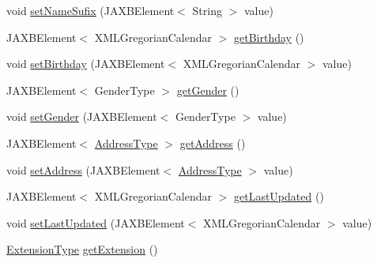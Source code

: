 \begin{DoxyCompactItemize}
\item 
void \hyperlink{classcom_1_1telefonica_1_1schemas_1_1unica_1_1rest_1_1directory_1_1v1_1_1UserPersonalInfoType_aadaae721fb2eded2ad7f74576fbb7bae}{setNameSufix} (JAXBElement$<$ String $>$ value)
\item 
JAXBElement$<$ XMLGregorianCalendar $>$ \hyperlink{classcom_1_1telefonica_1_1schemas_1_1unica_1_1rest_1_1directory_1_1v1_1_1UserPersonalInfoType_aa62b05ffbca263a1dc4df0349d376439}{getBirthday} ()
\item 
void \hyperlink{classcom_1_1telefonica_1_1schemas_1_1unica_1_1rest_1_1directory_1_1v1_1_1UserPersonalInfoType_abf1d21d341abdea4120e1a43ac30cc26}{setBirthday} (JAXBElement$<$ XMLGregorianCalendar $>$ value)
\item 
JAXBElement$<$ GenderType $>$ \hyperlink{classcom_1_1telefonica_1_1schemas_1_1unica_1_1rest_1_1directory_1_1v1_1_1UserPersonalInfoType_aad0acda007c02061e785817a5d967c41}{getGender} ()
\item 
void \hyperlink{classcom_1_1telefonica_1_1schemas_1_1unica_1_1rest_1_1directory_1_1v1_1_1UserPersonalInfoType_ad81c703be995200ec21edb13e1d2361a}{setGender} (JAXBElement$<$ GenderType $>$ value)
\item 
JAXBElement$<$ \hyperlink{classcom_1_1telefonica_1_1schemas_1_1unica_1_1rest_1_1common_1_1v1_1_1AddressType}{AddressType} $>$ \hyperlink{classcom_1_1telefonica_1_1schemas_1_1unica_1_1rest_1_1directory_1_1v1_1_1UserPersonalInfoType_a3900c2cc75ae29824a06ab924d9e287b}{getAddress} ()
\item 
void \hyperlink{classcom_1_1telefonica_1_1schemas_1_1unica_1_1rest_1_1directory_1_1v1_1_1UserPersonalInfoType_af6c9049e7da1aad953f92c14bb92d3e7}{setAddress} (JAXBElement$<$ \hyperlink{classcom_1_1telefonica_1_1schemas_1_1unica_1_1rest_1_1common_1_1v1_1_1AddressType}{AddressType} $>$ value)
\item 
JAXBElement$<$ XMLGregorianCalendar $>$ \hyperlink{classcom_1_1telefonica_1_1schemas_1_1unica_1_1rest_1_1directory_1_1v1_1_1UserPersonalInfoType_a4b26d2b72b2f2807c292ffca7747f63f}{getLastUpdated} ()
\item 
void \hyperlink{classcom_1_1telefonica_1_1schemas_1_1unica_1_1rest_1_1directory_1_1v1_1_1UserPersonalInfoType_a6856ad466c01e979d8b5297aa6e45b27}{setLastUpdated} (JAXBElement$<$ XMLGregorianCalendar $>$ value)
\item 
\hyperlink{classcom_1_1telefonica_1_1schemas_1_1unica_1_1rest_1_1common_1_1v1_1_1ExtensionType}{ExtensionType} \hyperlink{classcom_1_1telefonica_1_1schemas_1_1unica_1_1rest_1_1directory_1_1v1_1_1UserPersonalInfoType_a46c1bf154ad9befb0c7bf8f79160cc03}{getExtension} ()

\end{DoxyCompactItemize}
